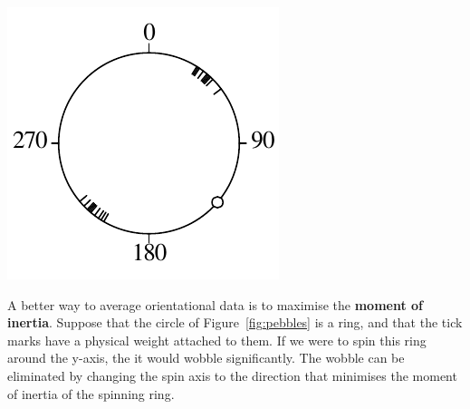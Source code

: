 \noindent\begin{minipage}[t][][b]{.25\textwidth}
\includegraphics[]{../figures/pebbles.pdf}\medskip
\end{minipage}
\begin{minipage}[t][][t]{.75\textwidth}
  \label{fig:pebbles}
\end{minipage}

A better way to average orientational data is to maximise the
\textbf{moment of inertia}. Suppose that the circle of
Figure~\ref{fig:pebbles} is a ring, and that the tick marks have a
physical weight attached to them. If we were to spin this ring around
the y-axis, the it would wobble significantly. The wobble can be
eliminated by changing the spin axis to the direction that minimises
the moment of inertia of the spinning ring.


